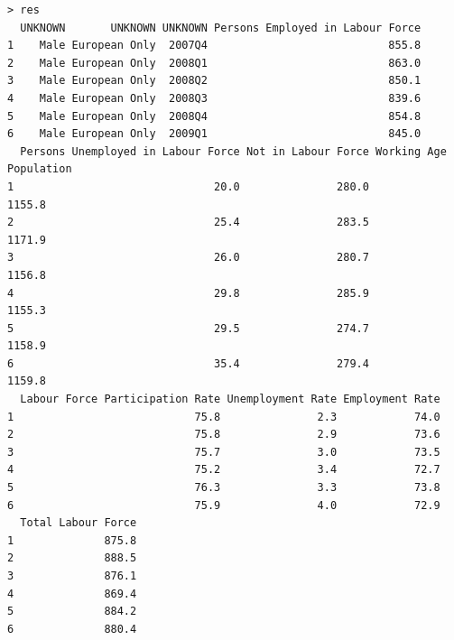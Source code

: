 \documentclass[a4paper]{article}
\begin{document}
\begin{verbatim}
> res 
  UNKNOWN       UNKNOWN UNKNOWN Persons Employed in Labour Force
1    Male European Only  2007Q4                            855.8
2    Male European Only  2008Q1                            863.0
3    Male European Only  2008Q2                            850.1
4    Male European Only  2008Q3                            839.6
5    Male European Only  2008Q4                            854.8
6    Male European Only  2009Q1                            845.0
  Persons Unemployed in Labour Force Not in Labour Force Working Age Population
1                               20.0               280.0                 1155.8
2                               25.4               283.5                 1171.9
3                               26.0               280.7                 1156.8
4                               29.8               285.9                 1155.3
5                               29.5               274.7                 1158.9
6                               35.4               279.4                 1159.8
  Labour Force Participation Rate Unemployment Rate Employment Rate
1                            75.8               2.3            74.0
2                            75.8               2.9            73.6
3                            75.7               3.0            73.5
4                            75.2               3.4            72.7
5                            76.3               3.3            73.8
6                            75.9               4.0            72.9
  Total Labour Force
1              875.8
2              888.5
3              876.1
4              869.4
5              884.2
6              880.4
\end{verbatim}

\newpage
\end{document}
